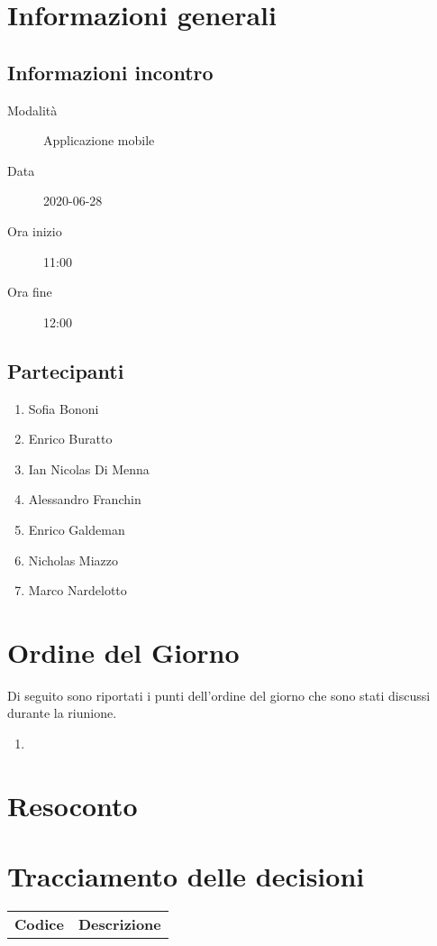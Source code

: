 \documentclass{article}
\begin{document}


\section{Informazioni generali}%
\label{sec:informazioni_generali}

\subsection{Informazioni incontro}%
\label{sub:informazioni_incontro}

\begin{description}
  \item[Modalità] Applicazione mobile 
  \item[Data] 2020-06-28
  \item[Ora inizio] 11:00
  \item[Ora fine] 12:00
\end{description}

\subsection{Partecipanti}%
\label{sub:partecipanti}

\begin{enumerate}
  \item Sofia Bononi
  \item Enrico Buratto
  \item Ian Nicolas Di Menna
  \item Alessandro Franchin
  \item Enrico Galdeman
  \item Nicholas Miazzo
  \item Marco Nardelotto
\end{enumerate}

\section{Ordine del Giorno}%
\label{ordine_del_giorno}
Di seguito sono riportati i punti dell'ordine del giorno che sono stati discussi durante la riunione.
\begin{enumerate}
  \item 
\end{enumerate}

\section{Resoconto}%
\label{resoconto}


\section{Tracciamento delle decisioni}
\begin{table}[H]
  \centering
  \begin{tabular}{p{4cm}|p{12cm}}
    \rowcolor{lightgray}
    \textbf{Codice}  & \textbf{Descrizione}      \\
  \end{tabular}
\end{table}
\end{document}
